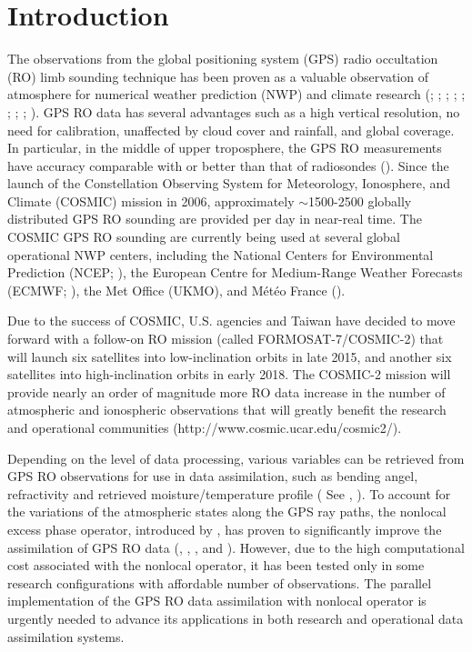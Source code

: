 \documentclass[12pt]{article}
\begin{document}
\section{Introduction}

The observations from the global positioning system (GPS) radio occultation (RO) limb sounding technique has been proven as a valuable observation of atmosphere for numerical weather prediction (NWP) and climate research (\cite{Kuo1997}; \cite{ZouGPS1999}; \cite{zouGPS2000}; \cite{LiuandZou2003}; \cite{Healy2005}; \cite{HuangCY2005}; \cite{Cucurull2006}; \cite{Cucurull2008}; \cite{Healy2006}). GPS RO data has several advantages such as a high vertical resolution, no need for calibration, unaffected by cloud cover and rainfall, and global coverage. In particular, in the middle of upper troposphere, the GPS RO measurements have accuracy comparable with or better than that of radiosondes (\cite{Kuo2005}). Since the launch of the Constellation Observing System for Meteorology, Ionosphere, and Climate (COSMIC) mission in 2006, approximately ${\sim}$1500-2500 globally distributed GPS RO sounding are provided per day in near-real time. The COSMIC GPS RO sounding are currently being used at several global operational NWP centers, including the National Centers for Environmental Prediction (NCEP; \cite{Cucurull2008}), the European Centre for Medium-Range Weather Forecasts (ECMWF; \cite{Healy2008}), the Met Office (UKMO), and M\'et\'eo France (\cite{Poli2009}).

Due to the success of COSMIC, U.S. agencies and Taiwan have decided to move forward with a follow-on RO mission (called FORMOSAT-7/COSMIC-2) that will launch six satellites into low-inclination orbits in late 2015, and another six satellites into high-inclination orbits in early 2018. The COSMIC-2 mission will provide nearly an order of magnitude more RO data increase in the number of atmospheric and ionospheric observations that will greatly benefit the research and operational communities (http://www.cosmic.ucar.edu/cosmic2/).

Depending on the level of data processing, various variables can be retrieved from GPS RO observations for use in data assimilation, such as bending angel, refractivity and retrieved moisture/temperature profile ( See  \cite{Kuo2000}, \cite{Kuo2004}). To account for the variations of the atmospheric states along the GPS ray paths, the nonlocal excess phase operator, introduced by \cite{Soko2005}, has proven to significantly improve the assimilation of GPS RO data (\cite{Soko2005}, \cite{Liu2008}, \cite{ChenSY2009}, \cite{Ma2009} and \cite{Shao2009}). However, due to the high computational cost associated with the nonlocal operator, it has been tested only in some research configurations with affordable number of observations. The parallel implementation of the GPS RO data assimilation with nonlocal operator is urgently needed to advance its applications in both research and operational data assimilation systems. 
\end{document}
